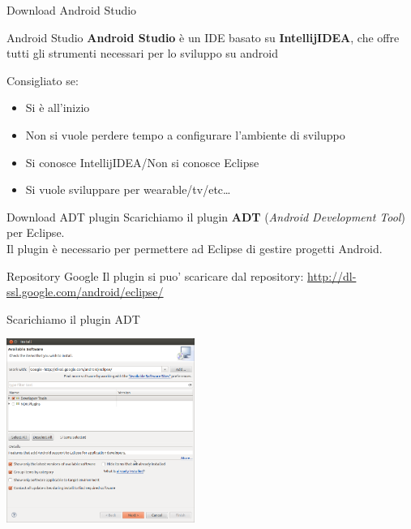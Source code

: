 \documentclass[xcolor=svgnames,11pt]{beamer}
\begin{document}
\begin{frame}{Download Android Studio}

\begin{block}{Android Studio}
\textbf{Android Studio} \`e un IDE basato su \textbf{IntellijIDEA}, che offre tutti gli strumenti necessari per lo sviluppo su android
\end{block}
\medskip
\pause

Consigliato se:
\begin{itemize}
\item Si \`e all'inizio
\item Non si vuole perdere tempo a configurare l'ambiente di sviluppo
\item Si conosce IntellijIDEA/Non si conosce Eclipse
\item Si vuole sviluppare per wearable/tv/etc\ldots
\end{itemize}
\end{frame}

\begin{frame}{Download ADT plugin}
Scarichiamo il plugin \textbf{ADT} (\emph{Android Development Tool}) per Eclipse.\\
\pause
\medskip
Il plugin \`e necessario per permettere ad Eclipse di gestire progetti Android.
\pause
\medskip
\begin{block}{Repository Google}
Il plugin si puo' scaricare dal repository: \url{http://dl-ssl.google.com/android/eclipse/}
\end{block}
\begin{center}
\end{center}
\end{frame}

\begin{frame}{Scarichiamo il plugin ADT}
\begin{center}
\includegraphics[height=6cm]{adt.png}
\end{center}
\end{frame}
\end{document}
